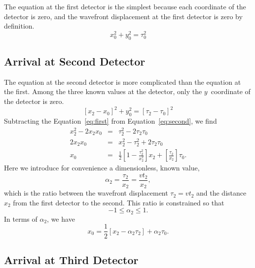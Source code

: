 \documentclass[twocolumn]{article}
\begin{document}
The equation at the first detector is the simplest because each coordinate of
the detector is zero, and the wavefront displacement at the first detector is
zero by definition.
\begin{equation}
   x_0^2 + y_0^2 = \tau_0^2
   \label{eq:first}
\end{equation}

\subsection{Arrival at Second Detector}

The equation at the second detector is more complicated than the equation at
the first.  Among the three known values at the detector, only the
$y$~coordinate of the detector is zero.
\begin{equation}
   \left[x_2 - x_0\right]^2 + y_0^2 = \left[\tau_2 - \tau_0\right]^2
   \label{eq:second}
\end{equation}
Subtracting the Equation~\ref{eq:first} from Equation~\ref{eq:second}, we find
\begin{eqnarray}
   \nonumber
   x_2^2 - 2 x_2 x_0 &=& \tau_2^2 - 2 \tau_2 \tau_0\\
   \nonumber
   2 x_2 x_0 &=& x_2^2 - \tau_2^2 + 2 \tau_2 \tau_0\\
   x_0 &=& \frac{1}{2}\left[1 - \frac{\tau_2^2}{x_2^2}\right] x_2 +
           \left[\frac{\tau_2}{x_2}\right] \tau_0.
\end{eqnarray}
Here we introduce for convenience a dimensionless, known value,
\begin{equation}
   \alpha_2 = \frac{\tau_2}{x_2} = \frac{v t_2}{x_2},
\end{equation}
which is the ratio between the wavefront displacement $\tau_2 = vt_2$ and the
distance $x_2$ from the first detector to the second.  This ratio is constrained
so that
\begin{equation}
   -1 \leq \alpha_2 \leq 1.
\end{equation}
In terms of $\alpha_2$, we have
\begin{equation}
   x_0 = \frac{1}{2}\left[x_2 - \alpha_2\tau_2\right] + \alpha_2\tau_0.
   \label{eq:t-x}
\end{equation}

\subsection{Arrival at Third Detector}
\end{document}
